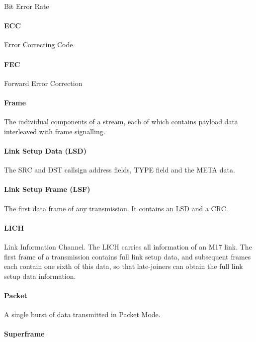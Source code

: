 \documentclass[a4paper,11pt,oneside]{book}
\begin{document}
Bit Error Rate

\paragraph{ECC}

Error Correcting Code

\paragraph{FEC}

Forward Error Correction

\paragraph{Frame}

The individual components of a stream, each of which contains payload data interleaved with frame signalling.

\paragraph{Link Setup Data (LSD)}

The SRC and DST callsign address fields, TYPE field and the META data.

\paragraph{Link Setup Frame (LSF)}

The first data frame of any transmission. It contains an LSD and a CRC.

\paragraph{LICH}

Link Information Channel. The LICH carries all information of an M17 link. The first frame of a transmission contains full link setup data, and subsequent frames each contain one sixth of this data, so that late-joiners can obtain the full link setup data information\@.

\paragraph{Packet}

A single burst of data transmitted in Packet Mode.

\paragraph{Superframe}
\end{document}
